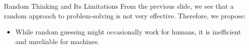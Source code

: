 \documentclass[aspectratio=169, xcolor={dvipsnames}, 10pt, brazil]{beamer}
\begin{document}
\begin{frame}{Random Thinking and Its Limitations}
From the previous slide, we see that a random approach to problem-solving is not very effective. Therefore, we propose:
    \begin{itemize}
    
         \item While random guessing might occasionally work for humans, it is inefficient and unreliable for machines.
         
    \end{itemize}
\end{frame}
\end{document}

